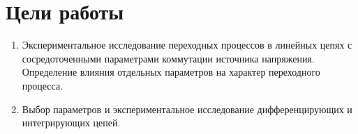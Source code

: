 \section{Цели работы}

\begin{enumerate}

\item Экспериментальное исследование переходных процессов в линейных цепях с сосредоточенными параметрами коммутации источника напряжения. Определение влияния отдельных параметров на характер переходного процесса.
\item Выбор параметров и экспериментальное исследование дифференцирующих и интегрирующих цепей.
\end{enumerate}


